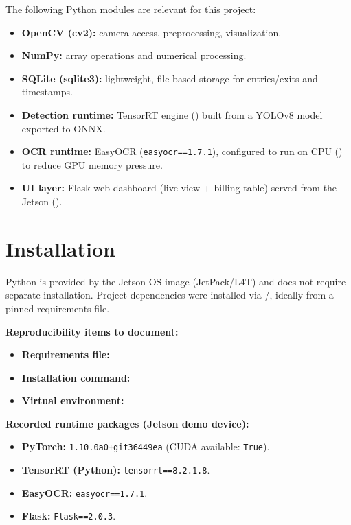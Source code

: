 \vspace{1mm}
\noindent
	The following Python modules are relevant for this project:
	\begin{itemize}
		\item \textbf{OpenCV (cv2):} camera access, preprocessing, visualization.
		\item \textbf{NumPy:} array operations and numerical processing.
		\item \textbf{SQLite (sqlite3):} lightweight, file-based storage for entries/exits and timestamps.
		\item \textbf{Detection runtime:} TensorRT engine () built from a YOLOv8 model exported to ONNX.
		\item \textbf{OCR runtime:} EasyOCR (\texttt{easyocr==1.7.1}), configured to run on CPU () to reduce GPU memory pressure.
		\item \textbf{UI layer:} Flask web dashboard (live view + billing table) served from the Jetson ().
	\end{itemize}

\section{Installation}
\noindent
Python is provided by the Jetson OS image (JetPack/L4T) and does not require separate installation.
Project dependencies were installed via /, ideally from a pinned requirements file.

\vspace{1mm}
\noindent
\textbf{Reproducibility items to document:}
\begin{itemize}
	\item \textbf{Requirements file:} 
	\item \textbf{Installation command:} 
	\item \textbf{Virtual environment:} 
\end{itemize}

\vspace{1mm}
\noindent
\textbf{Recorded runtime packages (Jetson demo device):}
\begin{itemize}
	\item \textbf{PyTorch:} \texttt{1.10.0a0+git36449ea} (CUDA available: \texttt{True}).
	\item \textbf{TensorRT (Python):} \texttt{tensorrt==8.2.1.8}.
	\item \textbf{EasyOCR:} \texttt{easyocr==1.7.1}.
	\item \textbf{Flask:} \texttt{Flask==2.0.3}.
\end{itemize}

